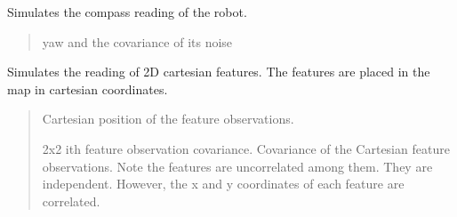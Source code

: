 \documentclass[letterpaper,10pt,english]{sphinxmanual}
\begin{document}
\begin{fulllineitems}
\begin{fulllineitems}
\begin{quote}
\begin{description}
\end{description}\end{quote}

\end{fulllineitems}


\begin{fulllineitems}
\label{\detokenize{robot_simulation:DifferentialDriveSimulatedRobot.DifferentialDriveSimulatedRobot.ReadCompass}}
\pysigstartsignatures
{}
\pysigstopsignatures
\sphinxAtStartPar
Simulates the compass reading of the robot.
\begin{quote}\begin{description}
\sphinxAtStartPar
yaw and the covariance of its noise 

\end{description}\end{quote}

\end{fulllineitems}


\begin{fulllineitems}
\label{\detokenize{robot_simulation:DifferentialDriveSimulatedRobot.DifferentialDriveSimulatedRobot.ReadCartesian2DFeature}}
\pysigstartsignatures
{}
\pysigstopsignatures
\sphinxAtStartPar
Simulates the reading of 2D cartesian features. The features are placed in the map in cartesian coordinates.
\begin{quote}\begin{description}
\sphinxAtStartPar
\begin{description}
\sphinxAtStartPar
Cartesian position of the feature observations.

\sphinxAtStartPar
2x2 i\sphinxhyphen{}th feature observation covariance.
Covariance of the Cartesian feature observations. Note the features are uncorrelated among them. They are independent. However, the x and y coordinates of each feature are correlated.


\end{description}
\end{description}
\end{quote}
\end{fulllineitems}
\end{fulllineitems}
\end{document}
